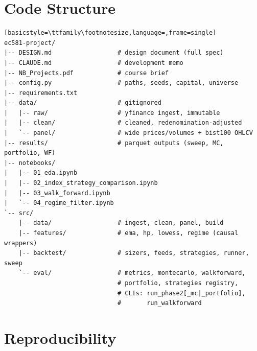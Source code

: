 \documentclass[11pt,a4paper]{article}
\begin{document}
\appendix
\section{Code Structure}\label{app:code}

\begin{lstlisting}[basicstyle=\ttfamily\footnotesize,language=,frame=single]
ec581-project/
|-- DESIGN.md                  # design document (full spec)
|-- CLAUDE.md                  # development memo
|-- NB_Projects.pdf            # course brief
|-- config.py                  # paths, seeds, capital, universe
|-- requirements.txt
|-- data/                      # gitignored
|   |-- raw/                   # yfinance ingest, immutable
|   |-- clean/                 # cleaned, redenomination-adjusted
|   `-- panel/                 # wide prices/volumes + bist100 OHLCV
|-- results/                   # parquet outputs (sweep, MC, portfolio, WF)
|-- notebooks/
|   |-- 01_eda.ipynb
|   |-- 02_index_strategy_comparison.ipynb
|   |-- 03_walk_forward.ipynb
|   `-- 04_regime_filter.ipynb
`-- src/
    |-- data/                  # ingest, clean, panel, build
    |-- features/              # ema, hp, lowess, regime (causal wrappers)
    |-- backtest/              # sizers, feeds, strategies, runner, sweep
    `-- eval/                  # metrics, montecarlo, walkforward,
                               # portfolio, strategies registry,
                               # CLIs: run_phase2[_mc|_portfolio],
                               #       run_walkforward
\end{lstlisting}

\section{Reproducibility}\label{app:repro}
\end{document}
